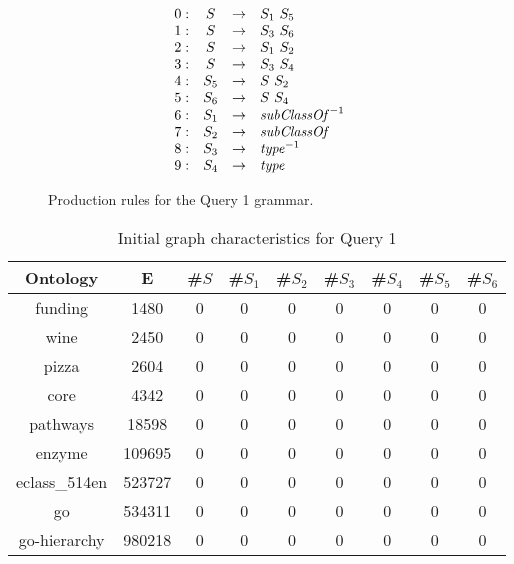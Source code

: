 \begin{figure}[h]
	\[
	\begin{array}{rccl}
	0: & S & \rightarrow & S_1 \ S_5 \\
	1: & S & \rightarrow & S_3 \ S_6 \\
	2: & S & \rightarrow & S_1 \ S_2 \\
	3: & S & \rightarrow & S_3 \ S_4 \\
	4: & S_5 & \rightarrow & S \ S_2 \\
	5: & S_6 & \rightarrow & S \ S_4 \\ 
	6: & S_1 & \rightarrow & \text{\emph{subClassOf}}^{-1} \\ 
	7: & S_2 & \rightarrow & \text{\emph{subClassOf}} \\ 
	8: & S_3 & \rightarrow & \text{\emph{type}}^{-1} \\ 
	9: & S_4 & \rightarrow & \text{\emph{type}} \\ 
	\end{array}
	\]
	\caption{Production rules for the Query 1 grammar.}
	\label{ProductionRulesQuery1}
\end{figure}

\begin{table*}[ht]
	\centering
	\caption{Initial graph characteristics for Query 1}
	\label{tbl1}
	
	\begin{tabular}{ | c | c | c | c | c | c | c | c | c |}
		\hline
		Ontology & E & \#$S$ & \#$S_1$ & \#$S_2$ & \#$S_3$ & \#$S_4$ & \#$S_5$ & \#$S_6$\\
		\hline 
		\hline
		funding        & 1480 & 0 & 0 & 0 & 0 & 0 & 0 & 0\\
		wine           & 2450 & 0 & 0 & 0 & 0 & 0 & 0 & 0\\
		pizza          & 2604 & 0 & 0 & 0 & 0 & 0 & 0 & 0\\
		core           & 4342 & 0 & 0 & 0 & 0 & 0 & 0 & 0\\
		pathways       & 18598 & 0 & 0 & 0 & 0 & 0 & 0 & 0\\
		enzyme         & 109695 & 0 & 0 & 0 & 0 & 0 & 0 & 0\\
		eclass\_514en  & 523727 & 0 & 0 & 0 & 0 & 0 & 0 & 0\\
		go             & 534311 & 0 & 0 & 0 & 0 & 0 & 0 & 0\\
		go-hierarchy   & 980218 & 0 & 0 & 0 & 0 & 0 & 0 & 0\\
		\hline
	\end{tabular}
	
\end{table*}


